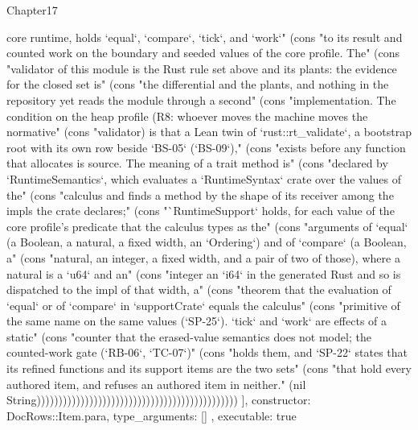 \begin{lexlean}{Chapter17}
\begin{semanticmodule}
{{core runtime, holds `equal`, `compare`, `tick`, and `work`" (cons "to its result and counted work on the boundary and seeded values of the core profile. The" (cons "validator of this module is the Rust rule set above and its plants: the evidence for the closed set is" (cons "the differential and the plants, and nothing in the repository yet reads the module through a second" (cons "implementation. The condition on the heap profile (R8: whoever moves the machine moves the normative" (cons "validator) is that a Lean twin of `rust::rt_validate`, a bootstrap root with its own row beside `BS-05` (`BS-09`)," (cons "exists before any function that allocates is source. The meaning of a trait method is" (cons "declared by `RuntimeSemantics`, which evaluates a `RuntimeSyntax` crate over the values of the" (cons "calculus and finds a method by the shape of its receiver among the impls the crate declares;" (cons "`RuntimeSupport` holds, for each value of the core profile's predicate that the calculus types as the" (cons "arguments of `equal` (a Boolean, a natural, a fixed width, an `Ordering`) and of `compare` (a Boolean, a" (cons "natural, an integer, a fixed width, and a pair of two of those), where a natural is a `u64` and an" (cons "integer an `i64` in the generated Rust and so is dispatched to the impl of that width, a" (cons "theorem that the evaluation of `equal` or of `compare` in `supportCrate` equals the calculus" (cons "primitive of the same name on the same values (`SP-25`). `tick` and `work` are effects of a static" (cons "counter that the erased-value semantics does not model; the counted-work gate (`RB-06`, `TC-07`)" (cons "holds them, and `SP-22` states that its refined functions and its support items are the two sets" (cons "that hold every authored item, and refuses an authored item in neither." (nil String))))))))))))))))))))))))))))))))))))))))))))))
    ],
    constructor: DocRows::Item.para,
    type_arguments: []
  },
  executable: true
}


\end{semanticmodule}
\end{lexlean}
